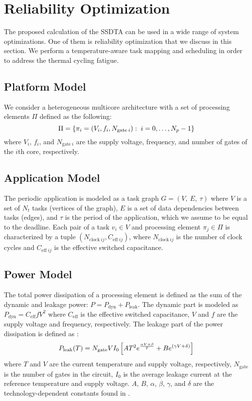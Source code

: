 \section{Reliability Optimization} 

The proposed calculation of the SSDTA can be used in a wide range of system
optimizations. One of them is reliability optimization that we discuss in this
section. We perform a temperature-aware task mapping and scheduling in order to
address the thermal cycling fatigue.

\subsection{Platform Model} 

We consider a heterogeneous multicore architecture with a set of processing
elements $\Pi$ defined as the following:
\[
  \Pi = \{ \pi_i = (V_i, f_i, N_{\mathrm{gate} \: i}): \; i = 0, \dots, N_p - 1 \}
\]
where $V_i$, $f_i$, and $N_{\text{gate} \: i}$ are the supply voltage,
frequency, and number of gates \cite{liao2005} of the $i$th core, respectively.

\subsection{Application Model} 

The periodic application is modeled as a task graph $G = (V, \: E, \: \tau)$
where $V$ is a set of $N_t$ tasks (vertices of the graph), $E$ is a set of data
dependencies between tasks (edges), and $\tau$ is the period of the application,
which we assume to be equal to the deadline. Each pair of a task $v_i \in V$ and
processing element $\pi_j \in \Pi$ is characterized by a tuple $(N_{\text{clock}
\: ij}, C_{\text{eff} \; ij})$, where $N_{\text{clock} \: ij}$ is the number of
clock cycles and $C_{\text{eff} \; ij}$ is the effective switched capacitance.

\subsection{Power Model} 

The total power dissipation of a processing element is defined as the sum of the
dynamic and leakage power: $P = P_\text{dyn} + P_\text{leak}$. The dynamic part
is modeled as $P_\text{dyn} = C_\text{eff} f V^2$ where $C_\text{eff}$ is the
effective switched capacitance, $V$ and $f$ are the supply voltage and
frequency, respectively. The leakage part of the power dissipation is defined as
\cite{liao2005}:
\begin{equation} \elab{total-power}
  P_\text{leak}(T) = N_\text{gate} V I_0 \left[ A T^2 e^{\frac{\alpha V + \beta}{T}} + B e^{(\gamma V + \delta)} \right]
\end{equation}
where $T$ and $V$ are the current temperature and supply voltage, respectively,
$N_\text{gate}$ is the number of gates in the circuit, $I_0$ is the average
leakage current at the reference temperature and supply voltage. $A$, $B$,
$\alpha$, $\beta$, $\gamma$, and $\delta$ are the technology-dependent constants
found in \cite{liao2005}.

